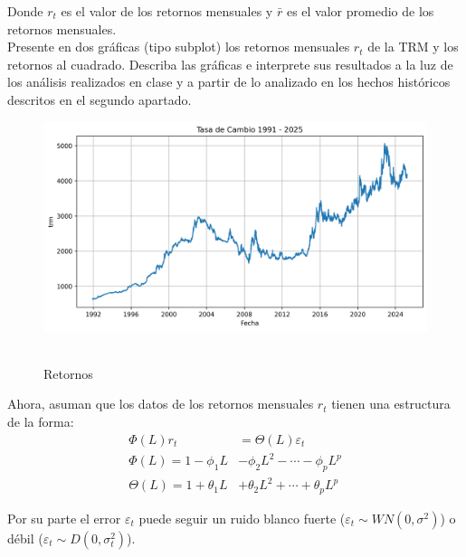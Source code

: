 \documentclass{article}
\theoremstyle{remark}
\theoremstyle{definition}
\begin{document}
\begin{enumerate}[label = \emph{\alph*})]
    {Donde $r_t$ es el valor de los retornos mensuales y $\bar{r}$ es el valor promedio de los retornos mensuales.} \\
    
    {Presente en dos gr\'aficas (tipo subplot) los retornos mensuales $r_t$ de la TRM y los retornos al cuadrado. Describa las gr\'aficas e interprete sus resultados a la luz de los an\'alisis realizados en clase y a partir de lo analizado en los hechos hist\'oricos descritos en el segundo apartado.}
        \begin{tcolorbox}[title=Soluci\'on 2.c]
            \begin{figure}[H]
                \centering
                \includegraphics[width=0.9\linewidth]{output/graf_trm.png}\
                \caption{Retornos}
                \label{fig:retorno}
            \end{figure}
        \end{tcolorbox}
\end{enumerate}

{Ahora, asuman que los datos de los retornos mensuales $r_t$ tienen una estructura de la forma:}
\begin{align*}
    \Phi(L)r_t &= \Theta(L)\varepsilon_t \\
    \Phi(L) = 1 − \phi_1L &− \phi_2L^2 − \cdots − \phi_pL^p \\
    \Theta(L) = 1 + \theta_1L &+ \theta_2L^2 + \cdots + \theta_pL^p
\end{align*}

{Por su parte el error $\varepsilon_t$ puede seguir un ruido blanco fuerte ($\varepsilon_t\sim WN(0,
\sigma^2)$) o d\'ebil ($\varepsilon_t\sim D(0,\sigma_t^2)$).}
\end{document}
